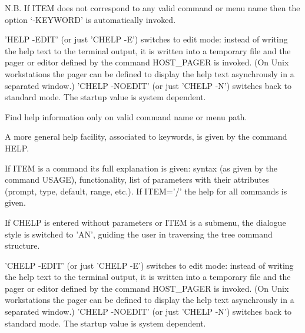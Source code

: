    \par
N.B. If ITEM does not correspond to any valid command or menu name then the 
   option `-KEYWORD' is automatically invoked.  

   \par
'HELP -EDIT' (or just 'CHELP -E') switches to edit mode: instead of writing 
   the help text to the terminal output, it is written into a temporary file 
   and the pager or editor defined by the command HOST\_PAGER is invoked.  (On 
   Unix workstations the pager can be defined to display the help text 
   asynchrously in a separated window.) 'CHELP -NOEDIT' (or just 'CHELP -N') 
   switches back to standard mode.  The startup value is system dependent.  

\ENDCMD


\BEGARG
{}
\ENDARG
{}
\ENDOPT

   \par
Find help information only on valid command name or menu path.  

   \par
A more general help facility, associated to keywords, is given by the 
   command HELP.  

   \par
If ITEM is a command its full explanation is given:  syntax (as given by 
   the command USAGE), functionality, list of parameters with their attributes 
   (prompt, type, default, range, etc.).  If ITEM='/' the help for all 
   commands is given.  

   \par
If CHELP is entered without parameters or ITEM is a submenu, the dialogue 
   style is switched to 'AN', guiding the user in traversing the tree command 
   structure.  

   \par
'CHELP -EDIT' (or just 'CHELP -E') switches to edit mode:  instead of 
   writing the help text to the terminal output, it is written into a 
   temporary file and the pager or editor defined by the command HOST\_PAGER 
   is invoked.  (On Unix workstations the pager can be defined to display the 
   help text asynchrously in a separated window.) 'CHELP -NOEDIT' (or just 
   'CHELP -N') switches back to standard mode.  The startup value is system 
   dependent.  

